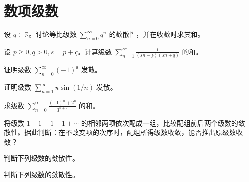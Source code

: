 \renewcommand{\thesection}{\arabic{section}}\renewcommand{\theHsection}{chapter.\arabic{section}}\setcounter{section}{13}\section{数项级数}
\noindent\begin{minipage}{\textwidth}
设 $q\in\mathbb R$。讨论等比级数 $\sum_{n=0}^{\infty}q^n$ 的敛散性，并在收敛时求其和。
\end{minipage}\par\vfill
\noindent\begin{minipage}{\textwidth}
设 $p\ge0,q>0,s=p+q$。计算级数 $\displaystyle\sum_{n=1}^{\infty}\frac1{(sn-p)(sn+q)}$ 的和。
\end{minipage}\par\vfill
\noindent\begin{minipage}{\textwidth}
证明级数 $\sum_{n=0}^{\infty}(-1)^n$ 发散。
\end{minipage}\par\vfill
\newpage
\noindent\begin{minipage}{\textwidth}
证明级数 $\sum_{n=1}^{\infty}n\sin(1/n)$ 发散。
\end{minipage}\par\vfill
\noindent\begin{minipage}{\textwidth}
求级数 $\displaystyle\sum_{n=0}^{\infty}\frac{(-1)^n+2^n}{3^{n+2}}$ 的和。
\end{minipage}\par\vfill
\noindent\begin{minipage}{\textwidth}
将级数 $1-1+1-1+\cdots$ 的相邻两项依次配成一组，比较配组前后两个级数的敛散性。据此判断：在不改变项的次序时，配组所得级数收敛，能否推出原级数收敛？
\end{minipage}\par\vfill
\newpage
\noindent\begin{minipage}{\textwidth}
判断下列级数的敛散性。
\end{minipage}\par\vfill
\noindent\begin{minipage}{\textwidth}
判断下列级数的敛散性。
\end{minipage}\par\vfill
